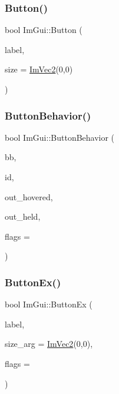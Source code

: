 \hypertarget{namespace_im_gui_a38094c568ce398db5a3abb9d3ac92030}{}\label{namespace_im_gui_a38094c568ce398db5a3abb9d3ac92030} 
\subsubsection{\texorpdfstring{Button()}{Button()}}
{\footnotesize\ttfamily bool Im\+Gui\+::\+Button (\begin{DoxyParamCaption}\item[{const char $\ast$}]{label,  }\item[{const \hyperlink{struct_im_vec2}{Im\+Vec2} \&}]{size = {\ttfamily \hyperlink{struct_im_vec2}{Im\+Vec2}(0,0)} }\end{DoxyParamCaption})}

\hypertarget{namespace_im_gui_a65a4f18b1bc8ce0f351687922089f374}{}\label{namespace_im_gui_a65a4f18b1bc8ce0f351687922089f374} 
\subsubsection{\texorpdfstring{Button\+Behavior()}{ButtonBehavior()}}
{\footnotesize\ttfamily bool Im\+Gui\+::\+Button\+Behavior (\begin{DoxyParamCaption}\item[{const \hyperlink{struct_im_rect}{Im\+Rect} \&}]{bb,  }\item[{Im\+Gui\+ID}]{id,  }\item[{bool $\ast$}]{out\+\_\+hovered,  }\item[{bool $\ast$}]{out\+\_\+held,  }\item[{Im\+Gui\+Button\+Flags}]{flags = {} }\end{DoxyParamCaption})}

\hypertarget{namespace_im_gui_ae479220c66b039874c6e4c9e9b22849f}{}\label{namespace_im_gui_ae479220c66b039874c6e4c9e9b22849f} 
\subsubsection{\texorpdfstring{Button\+Ex()}{ButtonEx()}}
{\footnotesize\ttfamily bool Im\+Gui\+::\+Button\+Ex (\begin{DoxyParamCaption}\item[{const char $\ast$}]{label,  }\item[{const \hyperlink{struct_im_vec2}{Im\+Vec2} \&}]{size\+\_\+arg = {\ttfamily \hyperlink{struct_im_vec2}{Im\+Vec2}(0,0)},  }\item[{Im\+Gui\+Button\+Flags}]{flags = {} }\end{DoxyParamCaption})}

